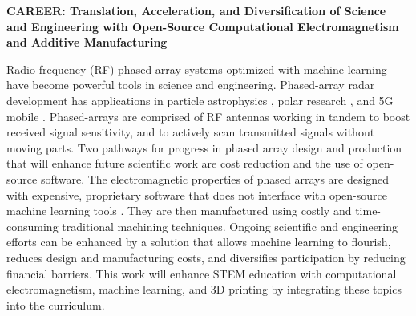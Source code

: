 \documentclass[../../main.tex]{subfiles}
\begin{document}
\textbf{CAREER: Translation, Acceleration, and Diversification of Science and Engineering with Open-Source Computational Electromagnetism and Additive Manufacturing} \\ \vspace{2.5mm}

Radio-frequency (RF) phased-array systems optimized with machine learning have become powerful tools in science and engineering.  Phased-array radar development has applications in particle astrophysics \cite{Vieregg_2016,AVVA201746,electronics10040415,Aguilar_2021}, polar research \cite{arnold_2020,9670670}, and 5G mobile \cite{5G_review_paper}.  Phased-arrays are comprised of RF antennas working in tandem to boost received signal sensitivity, and to actively scan transmitted signals without moving parts.  Two pathways for progress in phased array design and production that will enhance future scientific work are cost reduction and the use of open-source software.  The electromagnetic properties of phased arrays are designed with expensive, proprietary software that does not interface with open-source machine learning tools \cite{10.3390/electronics8121506}.  They are then manufactured using costly and time-consuming traditional machining techniques.  Ongoing scientific and engineering efforts can be enhanced by a solution that allows machine learning to flourish, reduces design and manufacturing costs, and diversifies participation by reducing financial barriers.  This work will enhance STEM education with computational electromagnetism, machine learning, and 3D printing by integrating these topics into the curriculum.  \\ \vspace{2.5mm}
\end{document}
